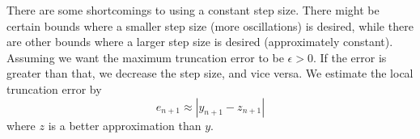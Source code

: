 \documentclass[12pt]{article}
\begin{document}
There are some shortcomings to using a constant step size. There might be certain bounds where a smaller step size (more oscillations) is desired, while there are other bounds where a larger step size is desired (approximately constant). Assuming we want the maximum truncation error to be $\epsilon > 0$. If the error is greater than that, we decrease the step size, and vice versa. We estimate the local truncation error by
$$e_{n+1} \approx |y_{n+1} - z_{n+1}|$$
where $z$ is a better approximation than $y$.
\end{document}
